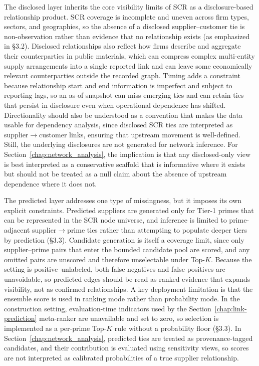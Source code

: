 The disclosed layer inherits the core visibility limits of SCR as a disclosure-based relationship product. SCR coverage is incomplete and uneven across firm types, sectors, and geographies, so the absence of a disclosed supplier--customer tie is non-observation rather than evidence that no relationship exists (as emphasized in \S3.2). Disclosed relationships also reflect how firms describe and aggregate their counterparties in public materials, which can compress complex multi-entity supply arrangements into a single reported link and can leave some economically relevant counterparties outside the recorded graph. Timing adds a constraint because relationship start and end information is imperfect and subject to reporting lags, so an as-of snapshot can miss emerging ties and can retain ties that persist in disclosure even when operational dependence has shifted. Directionality should also be understood as a convention that makes the data usable for dependency analysis, since disclosed SCR ties are interpreted as supplier$\rightarrow$customer links, ensuring that upstream movement is well-defined. Still, the underlying disclosures are not generated for network inference. For Section~\ref{chap:network_analysis}, the implication is that any disclosed-only view is best interpreted as a conservative scaffold that is informative where it exists but should not be treated as a null claim about the absence of upstream dependence where it does not.

The predicted layer addresses one type of missingness, but it imposes its own explicit constraints. Predicted suppliers are generated only for Tier-1 primes that can be represented in the SCR node universe, and inference is limited to prime-adjacent supplier$\rightarrow$prime ties rather than attempting to populate deeper tiers by prediction (\S3.3). Candidate generation is itself a coverage limit, since only supplier--prime pairs that enter the bounded candidate pool are scored, and any omitted pairs are unscored and therefore unselectable under Top-$K$. Because the setting is positive--unlabeled, both false negatives and false positives are unavoidable, so predicted edges should be read as ranked evidence that expands visibility, not as confirmed relationships. A key deployment limitation is that the ensemble score is used in ranking mode rather than probability mode. In the construction setting, evaluation-time indicators used by the Section~\ref{chap:link-prediction} meta-ranker are unavailable and set to zero, so selection is implemented as a per-prime Top-$K$ rule without a probability floor (\S3.3). In Section~\ref{chap:network_analysis}, predicted ties are treated as provenance-tagged candidates, and their contribution is evaluated using sensitivity views, so scores are not interpreted as calibrated probabilities of a true supplier relationship.

